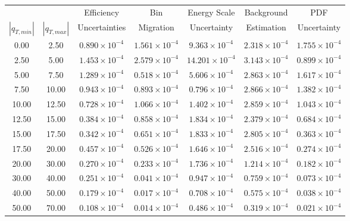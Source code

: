 \begin{tabular}{|c|c||c|c|c|c|c|}\hline
            &             & Efficiency &   Bin     & Energy Scale  & Background & PDF\\ 
$|q_{T,min}|$ & $|q_{T,max}|$ & Uncertainties & Migration & Uncertainty & Estimation & Uncertainty \\ \hline 
    0.00 &    2.50 & $0.890 \times 10^{-4}$ &  $1.561 \times 10^{-4}$ & $9.363 \times 10^{-4}$ & $2.318 \times 10^{-4}$ & $1.755 \times 10^{-4}$ \\ 
    2.50 &    5.00 & $1.453 \times 10^{-4}$ &  $2.579 \times 10^{-4}$ & $14.201 \times 10^{-4}$ & $3.143 \times 10^{-4}$ & $0.899 \times 10^{-4}$ \\ 
    5.00 &    7.50 & $1.289 \times 10^{-4}$ &  $0.518 \times 10^{-4}$ & $5.606 \times 10^{-4}$ & $2.863 \times 10^{-4}$ & $1.617 \times 10^{-4}$ \\ 
    7.50 &   10.00 & $0.943 \times 10^{-4}$ &  $0.893 \times 10^{-4}$ & $0.796 \times 10^{-4}$ & $2.866 \times 10^{-4}$ & $1.382 \times 10^{-4}$ \\ 
   10.00 &   12.50 & $0.728 \times 10^{-4}$ &  $1.066 \times 10^{-4}$ & $1.402 \times 10^{-4}$ & $2.859 \times 10^{-4}$ & $1.043 \times 10^{-4}$ \\ 
   12.50 &   15.00 & $0.384 \times 10^{-4}$ &  $0.858 \times 10^{-4}$ & $1.834 \times 10^{-4}$ & $2.379 \times 10^{-4}$ & $0.684 \times 10^{-4}$ \\ 
   15.00 &   17.50 & $0.342 \times 10^{-4}$ &  $0.651 \times 10^{-4}$ & $1.833 \times 10^{-4}$ & $2.805 \times 10^{-4}$ & $0.363 \times 10^{-4}$ \\ 
   17.50 &   20.00 & $0.457 \times 10^{-4}$ &  $0.526 \times 10^{-4}$ & $1.646 \times 10^{-4}$ & $2.516 \times 10^{-4}$ & $0.274 \times 10^{-4}$ \\ 
   20.00 &   30.00 & $0.270 \times 10^{-4}$ &  $0.233 \times 10^{-4}$ & $1.736 \times 10^{-4}$ & $1.214 \times 10^{-4}$ & $0.182 \times 10^{-4}$ \\ 
   30.00 &   40.00 & $0.251 \times 10^{-4}$ &  $0.041 \times 10^{-4}$ & $0.947 \times 10^{-4}$ & $0.759 \times 10^{-4}$ & $0.073 \times 10^{-4}$ \\ 
   40.00 &   50.00 & $0.179 \times 10^{-4}$ &  $0.017 \times 10^{-4}$ & $0.708 \times 10^{-4}$ & $0.575 \times 10^{-4}$ & $0.038 \times 10^{-4}$ \\ 
   50.00 &   70.00 & $0.108 \times 10^{-4}$ &  $0.014 \times 10^{-4}$ & $0.486 \times 10^{-4}$ & $0.319 \times 10^{-4}$ & $0.021 \times 10^{-4}$ \\ 

\end{tabular}
